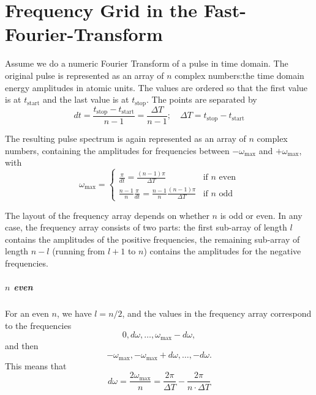 \chapter{Frequency Grid in the Fast-Fourier-Transform}
\label{AppendixFFT}

Assume we do a numeric Fourier Transform of a pulse in time domain. The
original pulse is represented as an array of $n$ complex numbers:the time
domain energy amplitudes in atomic units. The values are ordered so that the
first value is at $t_{\text{start}}$ and the last value is at
$t_{\text{stop}}$.%
The points are separated by
\begin{equation}
  dt = \frac{t_{\text{stop}}-t_{\text{start}}}{n-1} = \frac{\Delta T}{n-1};
  \quad
  \Delta T=t_{\text{stop}}-t_{\text{start}}
\end{equation}

The resulting pulse spectrum is again represented as an array of
$n$ complex numbers, containing the amplitudes for frequencies between
$-\omega_{\max}$ and $+\omega_{\max}$, with
\begin{equation}
  \omega_{\max} = \begin{cases}
     \frac{\pi}{dt} = \frac{(n-1)\pi}{\Delta T}
                      & \text{if $n$ even} \\
     \frac{n-1}{n} \frac{\pi}{dt} = \frac{n-1}{n} \frac{(n-1)\pi}{\Delta T}
                      & \text{if $n$ odd}
                  \end{cases}
\end{equation}

The layout of the frequency array depends on whether $n$ is odd or even. In any
case, the frequency array consists of two parts: the first sub-array of length $l$
contains the amplitudes of the positive frequencies, the remaining sub-array of
length $n-l$ (running from $l+1$ to $n$) contains the amplitudes for the
negative frequencies.

\paragraph{$n$ even}
For an even $n$, we have $l=n/2$, and the values in the frequency array correspond
to the frequencies $$0, d\omega, \dots, \omega_{\max}-d\omega,$$ and then
$$-\omega_{\max}, -\omega_{\max}+d\omega, \dots, -d\omega.$$ This means that
\begin{equation}
  d\omega = \frac{2 \omega_{\max}}{n} = \frac{2\pi}{\Delta T} - \frac{2\pi}{n \cdot \Delta T}
\end{equation}

